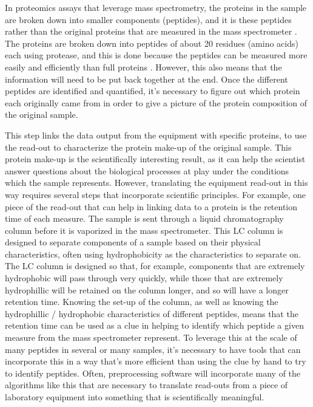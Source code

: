 \documentclass[
]{book}
\begin{document}
In proteomics assays that leverage mass spectrometry, the proteins in the
sample are broken down into smaller components (peptides), and it is these
peptides rather than the original proteins that are measured in the
mass spectrometer \citep{steen2004abc}. The proteins are broken down into
peptides of about 20 residues (amino acids) each using protease, and this
is done because the peptides can be measured more easily and efficiently
than full proteins \citep{steen2004abc}. However, this also means that the
information will need to be put back together at the end. Once the different
peptides are identified and quantified, it's necessary to figure out which
protein each originally came from in order to give a picture of the protein
composition of the original sample.

This step links the data output from the equipment with specific proteins, to
use the read-out to characterize the protein make-up of the original sample.
This protein make-up is the scientifically interesting result, as it can help
the scientist answer questions about the biological processes at play under the
conditions which the sample represents. However, translating the equipment
read-out in this way requires several steps that incorporate scientific
principles. For example, one piece of the read-out that can help in linking data
to a protein is the retention time of each measure. The sample is sent through a
liquid chromatography column before it is vaporized in the mass spectrometer.
This LC column is designed to separate components of a sample based on their
physical characteristics, often using hydrophobicity as the characteristics to
separate on. The LC column is designed so that, for example, components that are
extremely hydrophobic will pass through very quickly, while those that are
extremely hydrophillic will be retained on the column longer, and so will have a
longer retention time. Knowing the set-up of the column, as well as knowing the
hydrophillic / hydrophobic characteristics of different peptides, means that the
retention time can be used as a clue in helping to identify which peptide a
given measure from the mass spectrometer represent. To leverage this at the
scale of many peptides in several or many samples, it's necessary to have tools
that can incorporate this in a way that's more efficient than using the clue
by hand to try to identify peptides. Often, preprocessing software will
incorporate many of the algorithms like this that are necessary to translate
read-outs from a piece of laboratory equipment into something that is
scientifically meaningful.
\end{document}
